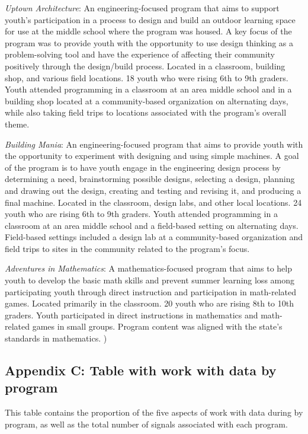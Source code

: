 \documentclass[]{msu-thesis}
\theoremstyle{definition}
\theoremstyle{definition}
\theoremstyle{definition}
\theoremstyle{remark}
\begin{document}
\emph{Uptown Architecture}: An engineering-focused program that aims to
support youth's participation in a process to design and build an
outdoor learning space for use at the middle school where the program
was housed. A key focus of the program was to provide youth with the
opportunity to use design thinking as a problem-solving tool and have
the experience of affecting their community positively through the
design/build process. Located in a classroom, building shop, and various
field locations. 18 youth who were rising 6th to 9th graders. Youth
attended programming in a classroom at an area middle school and in a
building shop located at a community-based organization on alternating
days, while also taking field trips to locations associated with the
program's overall theme.

\emph{Building Mania}: An engineering-focused program that aims to
provide youth with the opportunity to experiment with designing and
using simple machines. A goal of the program is to have youth engage in
the engineering design process by determining a need, brainstorming
possible designs, selecting a design, planning and drawing out the
design, creating and testing and revising it, and producing a final
machine. Located in the classroom, design labs, and other local
locations. 24 youth who are rising 6th to 9th graders. Youth attended
programming in a classroom at an area middle school and a field-based
setting on alternating days. Field-based settings included a design lab
at a community-based organization and field trips to sites in the
community related to the program's focus.

\emph{Adventures in Mathematics}: A mathematics-focused program that
aims to help youth to develop the basic math skills and prevent summer
learning loss among participating youth through direct instruction and
participation in math-related games. Located primarily in the classroom.
20 youth who are rising 8th to 10th graders. Youth participated in
direct instructions in mathematics and math-related games in small
groups. Program content was aligned with the state's standards in
mathematics. )

\subsection{Appendix C: Table with work with data by
program}\label{appendix-c-table-with-work-with-data-by-program}

This table contains the proportion of the five aspects of work with data
during by program, as well as the total number of signals associated
with each program.
\end{document}
